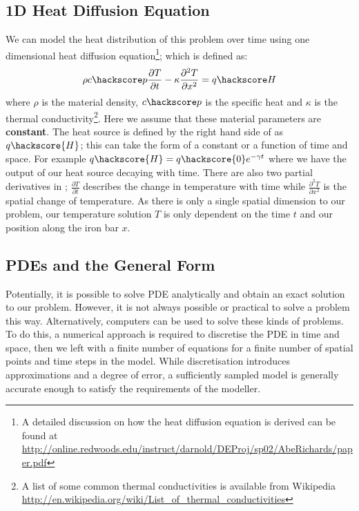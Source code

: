 \subsection{1D Heat Diffusion Equation}
We can model the heat distribution of this problem over time using one dimensional heat diffusion equation\footnote{A detailed discussion on how the heat diffusion equation is derived can be found at \url{http://online.redwoods.edu/instruct/darnold/DEProj/sp02/AbeRichards/paper.pdf}};
which is defined as:
\begin{equation}
\rho c\hackscore p \frac{\partial T}{\partial t} - \kappa \frac{\partial^{2} T}{\partial x^{2}} = q\hackscore H 
\label{eqn:hd}
\end{equation}
where $\rho$ is the material density, $c\hackscore p$ is the specific heat and $\kappa$ is the thermal 
conductivity\footnote{A list of some common thermal conductivities is available from Wikipedia \url{http://en.wikipedia.org/wiki/List_of_thermal_conductivities}}. Here we assume that these material 
parameters are \textbf{constant}. 
The heat source is defined by the right hand side of  as $q\hackscore{H}$; this can take the form of a constant or a function of time and space. For example $q\hackscore{H} = q\hackscore{0}e^{-\gamma t}$ where we have the output of our heat source decaying with time. There are also two partial derivatives in ; $\frac{\partial T}{\partial t}$ describes the change in temperature with time while $\frac{\partial ^2 T}{\partial x^2}$ is the spatial change of temperature. As there is only a single spatial dimension to our problem, our temperature solution $T$ is only dependent on the time $t$ and our position along the iron bar $x$.

\subsection{PDEs and the General Form}
Potentially, it is possible to solve PDE  analytically and obtain an exact solution to our problem. However, it is not always possible or practical to solve a problem this way. Alternatively, computers can be used to solve these kinds of problems. To do this, a numerical approach is required to discretise 
the PDE  in time and space, then we left with a finite number of equations for a finite number of spatial points and time steps in the model. While discretisation introduces approximations and a degree of error, a sufficiently sampled model is generally accurate enough to satisfy the requirements of the modeller.

